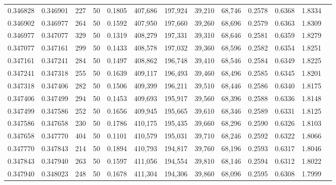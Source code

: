 \begin{tabular}{rrrrrrrrrrrrr}
0.346828 & 0.346901 &   227 &  50 &                                     0.1805 & 407,686 & 197,924 &  39,210 &  68,746 & 0.2578 & 0.6368 & 1.8334 \\
0.346902 & 0.346977 &   264 &  50 &                                     0.1592 & 407,950 & 197,660 &  39,260 &  68,696 & 0.2579 & 0.6363 & 1.8309 \\
0.346977 & 0.347077 &   329 &  50 &                                     0.1319 & 408,279 & 197,331 &  39,310 &  68,646 & 0.2581 & 0.6359 & 1.8279 \\
0.347077 & 0.347161 &   299 &  50 &                                     0.1433 & 408,578 & 197,032 &  39,360 &  68,596 & 0.2582 & 0.6354 & 1.8251 \\
0.347161 & 0.347241 &   284 &  50 &                                     0.1497 & 408,862 & 196,748 &  39,410 &  68,546 & 0.2584 & 0.6349 & 1.8225 \\
0.347241 & 0.347318 &   255 &  50 &                                     0.1639 & 409,117 & 196,493 &  39,460 &  68,496 & 0.2585 & 0.6345 & 1.8201 \\
0.347318 & 0.347406 &   282 &  50 &                                     0.1506 & 409,399 & 196,211 &  39,510 &  68,446 & 0.2586 & 0.6340 & 1.8175 \\
0.347406 & 0.347499 &   294 &  50 &                                     0.1453 & 409,693 & 195,917 &  39,560 &  68,396 & 0.2588 & 0.6336 & 1.8148 \\
0.347499 & 0.347586 &   252 &  50 &                                     0.1656 & 409,945 & 195,665 &  39,610 &  68,346 & 0.2589 & 0.6331 & 1.8125 \\
0.347586 & 0.347658 &   230 &  50 &                                     0.1786 & 410,175 & 195,435 &  39,660 &  68,296 & 0.2590 & 0.6326 & 1.8103 \\
0.347658 & 0.347770 &   404 &  50 &                                     0.1101 & 410,579 & 195,031 &  39,710 &  68,246 & 0.2592 & 0.6322 & 1.8066 \\
0.347770 & 0.347843 &   214 &  50 &                                     0.1894 & 410,793 & 194,817 &  39,760 &  68,196 & 0.2593 & 0.6317 & 1.8046 \\
0.347843 & 0.347940 &   263 &  50 &                                     0.1597 & 411,056 & 194,554 &  39,810 &  68,146 & 0.2594 & 0.6312 & 1.8022 \\
0.347940 & 0.348023 &   248 &  50 &                                     0.1678 & 411,304 & 194,306 &  39,860 &  68,096 & 0.2595 & 0.6308 & 1.7999 \\

\end{tabular}
